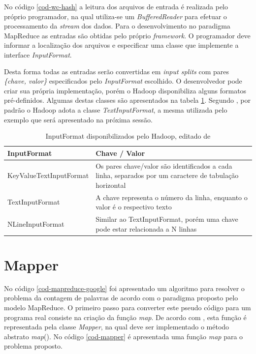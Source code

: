 No código \ref{cod-wc-hash} a leitura dos arquivos de entrada é realizada pelo próprio programador, na qual utiliza-se um \textit{BufferedReader} para efetuar o processamento da \textit{stream} dos dados. Para o desenvolvimento no paradigma MapReduce as entradas são obtidas pelo próprio \textit{framework}. O programador deve informar a localização dos arquivos e especificar uma classe que implemente a interface \textit{InputFormat}. 

Desta forma todas as entradas serão convertidas em \textit{input splits} com pares \textit{\{chave, valor\}} especificados pelo \textit{InputFormat} escolhido. O desenvolvedor pode criar sua própria implementação, porém o Hadoop disponibiliza alguns formatos pré-definidos. Algumas destas classes são apresentados na tabela \ref{tab-inputformat}. Segundo , por padrão o Hadoop adota a classe \textit{TextInputFormat}, a mesma utilizada pelo exemplo que será apresentado na próxima sessão.

\begin{table}[!ht]
\begin{center}
  \begin{tabular}{|p{5cm}|p{5cm}|}
	\hline
	InputFormat & Chave / Valor	
	\\ \hline
	KeyValueTextInputFormat & Os pares chave/valor são identificados a cada linha, separados por um caractere de tabulação horizontal
	\\ \hline
	TextInputFormat & A chave representa o número da linha, enquanto o valor é o respectivo texto
	\\ \hline
	NLineInputFormat & Similar ao TextInputFormat, porém uma chave pode estar relacionada a N linhas
	\\ \hline
  \end{tabular}
  \caption{InputFormat disponibilizados pelo Hadoop, editado de 
  }
\label{tab-inputformat}
\end{center}
\end{table}
\FloatBarrier

\section{Mapper}

No código \ref{cod-mapreduce-google} foi apresentado um algoritmo para resolver o problema da contagem de palavras de acordo com o paradigma proposto pelo modelo MapReduce. O primeiro passo para converter este pseudo código para um programa real consiste na criação da função \textit{map}. De acordo com , esta função é representada pela classe \textit{Mapper}, na qual deve ser implementado o método abstrato \textit{map}(). No código \ref{cod-mapper} é apresentada uma função \textit{map} para o problema proposto.

